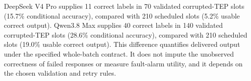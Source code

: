 DeepSeek V4 Pro supplies 11 correct labels in 70 validated corrupted-TEP slots (15.7\% conditional accuracy), compared with 210 scheduled slots (5.2\% usable correct output). 
Qwen3.8 Max supplies 40 correct labels in 140 validated corrupted-TEP slots (28.6\% conditional accuracy), compared with 210 scheduled slots (19.0\% usable correct output). 
This difference quantifies delivered output under the specified whole-batch contract. It does not impute the unobserved correctness of failed responses or measure fault-alarm utility, and it depends on the chosen validation and retry rules.
